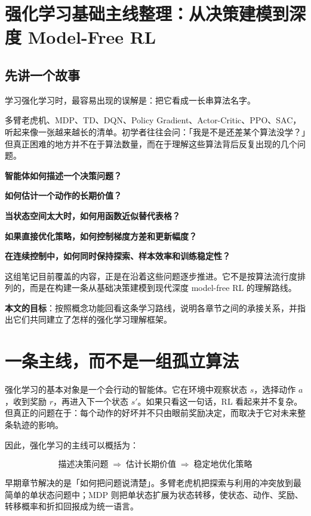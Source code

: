 \documentclass{article}
\begin{document}
\section*{强化学习基础主线整理：从决策建模到深度 Model-Free RL}

\subsection*{先讲一个故事}

学习强化学习时，最容易出现的误解是：把它看成一长串算法名字。

多臂老虎机、MDP、TD、DQN、Policy Gradient、Actor-Critic、PPO、SAC，听起来像一张越来越长的清单。初学者往往会问：「我是不是还差某个算法没学？」但真正困难的地方并不在于算法数量，而在于理解这些算法背后反复出现的几个问题。

\textbf{智能体如何描述一个决策问题？}

\textbf{如何估计一个动作的长期价值？}

\textbf{当状态空间太大时，如何用函数近似替代表格？}

\textbf{如果直接优化策略，如何控制梯度方差和更新幅度？}

\textbf{在连续控制中，如何同时保持探索、样本效率和训练稳定性？}

这组笔记目前覆盖的内容，正是在沿着这些问题逐步推进。它不是按算法流行度排列的，而是在构建一条从基础决策建模到现代深度 model-free RL 的理解路线。

\textbf{本文的目标}：按照概念功能回看这条学习路线，说明各章节之间的承接关系，并指出它们共同建立了怎样的强化学习理解框架。

\section*{一条主线，而不是一组孤立算法}

强化学习的基本对象是一个会行动的智能体。它在环境中观察状态 $s$，选择动作 $a$，收到奖励 $r$，再进入下一个状态 $s'$。如果只看这一句话，RL 看起来并不复杂。但真正的问题在于：每个动作的好坏并不只由眼前奖励决定，而取决于它对未来整条轨迹的影响。

因此，强化学习的主线可以概括为：

\[
\boxed{
\text{描述决策问题}
\;\Longrightarrow\;
\text{估计长期价值}
\;\Longrightarrow\;
\text{稳定地优化策略}
}
\]

早期章节解决的是「如何把问题说清楚」。多臂老虎机把探索与利用的冲突放到最简单的单状态问题中；MDP 则把单状态扩展为状态转移，使状态、动作、奖励、转移概率和折扣回报成为统一语言。
\end{document}
